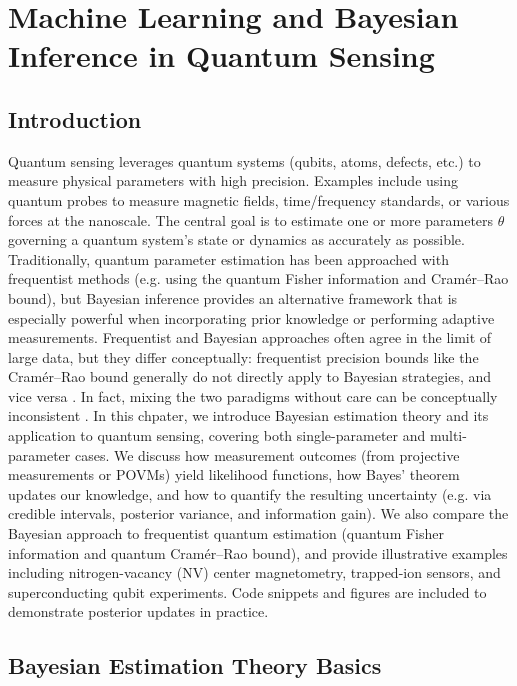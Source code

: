 \chapter{Machine Learning and Bayesian Inference in Quantum Sensing}

\section{Introduction}

Quantum sensing leverages quantum systems (qubits, atoms, defects,
etc.) to measure physical parameters with high precision. Examples
include using quantum probes to measure magnetic fields,
time/frequency standards, or various forces at the nanoscale. The
central goal is to estimate one or more parameters $\theta$ governing
a quantum system’s state or dynamics as accurately as
possible. Traditionally, quantum parameter estimation has been
approached with frequentist methods (e.g. using the quantum Fisher
information and Cramér–Rao bound), but Bayesian inference provides an
alternative framework that is especially powerful when incorporating
prior knowledge or performing adaptive measurements. Frequentist and
Bayesian approaches often agree in the limit of large data, but they
differ conceptually: frequentist precision bounds like the Cramér–Rao
bound generally do not directly apply to Bayesian strategies, and vice
versa . In fact, mixing the two paradigms without care can be
conceptually inconsistent . In this chpater, we introduce
Bayesian estimation theory and its application to quantum sensing,
covering both single-parameter and multi-parameter cases. We discuss
how measurement outcomes (from projective measurements or POVMs) yield
likelihood functions, how Bayes’ theorem updates our knowledge, and
how to quantify the resulting uncertainty (e.g. via credible
intervals, posterior variance, and information gain). We also compare
the Bayesian approach to frequentist quantum estimation (quantum
Fisher information and quantum Cramér–Rao bound), and provide
illustrative examples including nitrogen-vacancy (NV) center
magnetometry, trapped-ion sensors, and superconducting qubit
experiments. Code snippets and figures are included to demonstrate
posterior updates in practice.



\section{Bayesian Estimation Theory Basics}

